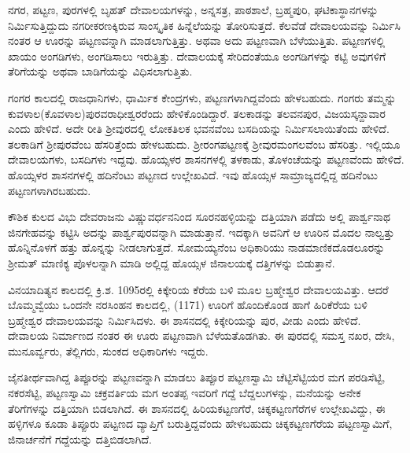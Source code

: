 ನಗರ, ಪಟ್ಟಣ, ಪುರಗಳಲ್ಲಿ ಬೃಹತ್​ ದೇವಾಲಯಗಳನ್ನು, ಅನ್ನಸತ್ರ, ಪಾಠಶಾಲೆ, ಬ್ರಹ್ಮಪುರಿ, ಘಟಿಕಾಸ್ಥಾನಗಳನ್ನು ನಿರ್ಮಿಸುತ್ತಿದ್ದುದು ನಗರೀಕರಣಕ್ಕಿರುವ ಸಾಂಸ್ಕೃತಿಕ ಹಿನ್ನೆಲೆಯನ್ನು ತೋರಿಸುತ್ತದೆ. ಕೆಲವೆಡೆ ದೇವಾಲಯವನ್ನು ನಿರ್ಮಿಸಿ ನಂತರ ಆ ಊರನ್ನು ಪಟ್ಟಣವನ್ನಾಗಿ ಮಾಡಲಾಗುತ್ತಿತ್ತು. ಅಥವಾ ಅದು ಪಟ್ಟಣವಾಗಿ ಬೆಳೆಯುತ್ತಿತು. ಪಟ್ಟಣಗಳಲ್ಲಿ ಖಾಯಂ ಅಂಗಡಿಗಳು, ಅಂಗಡಿಸಾಲು ಇರುತ್ತಿತ್ತು. ದೇವಾಲಯಕ್ಕೆ ಸೇರಿದಂತೆಯೂ ಅಂಗಡಿಗಳನ್ನು ಕಟ್ಟಿ ಅವುಗಳಿಗೆ ತೆರಿಗೆಯನ್ನು ಅಥವಾ ಬಾಡಿಗೆಯನ್ನು ವಿಧಿಸಲಾಗುತ್ತಿತು.

ಗಂಗರ ಕಾಲದಲ್ಲಿ ರಾಜಧಾನಿಗಳು, ಧಾರ್ಮಿಕ ಕೇಂದ್ರಗಳು, ಪಟ್ಟಣಗಳಾಗಿದ್ದವೆಂದು ಹೇಳಬಹುದು. ಗಂಗರು ತಮ್ಮನ್ನು ಕುವಳಾಲ(ಕೊವಳಾಲ)ಪುರವರಾಧೀಶ್ವರರೆಂದು ಹೇಳಿಕೊಂಡಿದ್ದಾರೆ. ತಲಕಾಡನ್ನು ತಲವನಪುರ, ವಿಜಯಸ್ಕನ್ದಾವಾರ ಎಂದು ಹೇಳಿದೆ. ಅದೇ ರೀತಿ ಶ‍್ರೀವುರದಲ್ಲಿ ಲೋಕತಿಲಕ ಭವನವೆಂಬ ಬಸದಿಯನ್ನು ನಿರ್ಮಿಸಲಾಯಿತೆಂದು ಹೇಳಿದೆ. ತಲಕಾಡಿಗೆ ಶ‍್ರೀಪುರವೆಂಬ ಹೆಸರಿತ್ತೆಂದು ಹೇಳಬಹುದು. ಶ‍್ರೀರಂಗಪಟ್ಟಣಕ್ಕೆ ಶ‍್ರೀವುರಮಂಗಲವೆಂಬ ಹೆಸರಿತ್ತು. ಇಲ್ಲಿಯೂ ದೇವಾಲಯಗಳು, ಬಸದಿಗಳು ಇದ್ದವು. ಹೊಯ್ಸಳರ ಶಾಸನಗಳಲ್ಲಿ ತಳಕಾಡು,  ತೊಳಂಚೆಯನ್ನು ಪಟ್ಟಣವೆಂದು ಹೇಳಿದೆ. ಹೊಯ್ಸಳರ ಶಾಸನಗಳಲ್ಲಿ ಹದಿನೆಂಟು ಪಟ್ಟಣದ ಉಲ್ಲೇಖವಿದೆ. ಇವು ಹೊಯ್ಸಳ ಸಾಮ್ರಾಜ್ಯದಲ್ಲಿದ್ದ ಹದಿನೆಂಟು ಪಟ್ಟಣಗಳಾಗಿರಬಹುದು.

ಕೌಶಿಕ ಕುಲದ ವಿಭು ದೇವರಾಜನು ವಿಷ್ಣುವರ್ಧನನಿಂದ ಸೂರನಹಳ್ಳಿಯನ್ನು ದತ್ತಿಯಾಗಿ ಪಡೆದು ಅಲ್ಲಿ ಪಾರ್ಶ್ವನಾಥ ಜಿನಗೇಹವನ್ನು ಕಟ್ಟಿಸಿ ಅದನ್ನು ಪಾರ್ಶ್ವಪುರವನ್ನಾಗಿ ಮಾಡುತ್ತಾನೆ. ಇದಕ್ಕಾಗಿ ಅವನಿಗೆ ಆ ಊರಿನ ಮೊದಲ ನಾಲ್ವತ್ತು ಹೊನ್ನಿನೊಳಗೆ ಹತ್ತು ಹೊನ್ನನ್ನು ನೀಡಲಾಗುತ್ತದೆ. ಸೋಮಯ್ಯನೆಂಬ ಅಧಿಕಾರಿಯು ನಾಡಮಾಣಿಕದೊಡಲೂರನ್ನು ಶ‍್ರೀಮತ್​ ಮಾಣಿಕ್ಯ ಪೊಳಲನ್ನಾಗಿ ಮಾಡಿ ಅಲ್ಲಿದ್ದ ಹೊಯ್ಸಳ ಜಿನಾಲಯಕ್ಕೆ ದತ್ತಿಗಳನ್ನು ಬಿಡುತ್ತಾನೆ.

ವಿನಯಾದಿತ್ಯನ ಕಾಲದಲ್ಲಿ ಕ್ರಿ.ಶ. 1095ರಲ್ಲಿ ಕಿಕ್ಕೇರಿಯ ಕೆರೆಯ ಬಳಿ ಮೂಲ ಬ್ರಹ್ಮೇಶ್ವರ ದೇವಾಲಯವಿತ್ತು. ಆದರೆ ಬೊಮ್ಮವ್ವೆಯು ಒಂದನೇ ನರಸಿಂಹನ ಕಾಲದಲ್ಲಿ, (1171) ಊರಿಗೆ ಹೊಂದಿಕೊಂಡ ಹಾಗೆ ಹಿರಿಕೆರೆಯ ಬಳಿ ಬ್ರಹ್ಮೇಶ್ವರ ದೇವಾಲಯವನ್ನು ನಿರ್ಮಿಸಿದಳು. ಈ ಶಾಸನದಲ್ಲಿ ಕಿಕ್ಕೇರಿಯನ್ನು ಪುರ, ವೀಡು ಎಂದು ಹೇಳಿದೆ. ದೇವಾಲಯ ನಿರ್ಮಾಣದ ನಂತರ ಈ ಊರು ಪಟ್ಟಣವಾಗಿ ಬೆಳೆಯತೊಡಗಿತು. ಈ ಪುರದಲ್ಲಿ ಸಮಸ್ತ ನಖರ, ದೇಸಿ, ಮುನೂರ್ವ್ವರು, ತೆಲ್ಲಿಗರು, ಸುಂಕದ ಅಧಿಕಾರಿಗಳು ಇದ್ದರು.

ಜೈನತೀರ್ಥವಾಗಿದ್ದ ತಿಪ್ಪೂರನ್ನು ಪಟ್ಟಣವನ್ನಾಗಿ ಮಾಡಲು ತಿಪ್ಪೂರ ಪಟ್ಟಣಸ್ವಾಮಿ ಚೆಟ್ಟಿಸೆಟ್ಟಿಯರ ಮಗ ಪರಡಿಸೆಟ್ಟಿ, ನಕರಸೆಟ್ಟಿ, ಪಟ್ಟಣಸ್ವಾಮಿ ಚಕ್ರವರ್ತಿಯ ಮಗ ಅಂತಪ್ಪ ಇವರಿಗೆ ಗದ್ದೆ ಬೆದ್ದಲುಗಳನ್ನು, ಮನೆಯನ್ನು ಅನೇಕ ತೆರಿಗೆಗಳನ್ನು ದತ್ತಿಯಾಗಿ ಬಿಡಲಾಗಿದೆ. ಈ ಶಾಸನದಲ್ಲಿ ಹಿರಿಯಕಟ್ಟಣಗೆರೆ, ಚಿಕ್ಕಕಟ್ಟಣಗೆರೆಗಳ ಉಲ್ಲೇಖವಿದ್ದು, ಈ ಹಳ್ಳಿಗಳೂ ಕೂಡಾ ತಿಪ್ಪೂರು ಪಟ್ಟಣದ ವ್ಯಾಪ್ತಿಗೆ ಬರುತ್ತಿದ್ದವೆಂದು ಹೇಳಬಹುದು ಚಿಕ್ಕಕಟ್ಟಣಗೆರೆಯ ಪಟ್ಟಣಸ್ವಾಮಿಗೆ, ಜಿನಾರ್ಚನೆಗೆ ಗದ್ದೆಯನ್ನು ದತ್ತಿಬಿಡಲಾಗಿದೆ.

